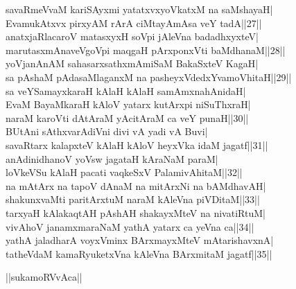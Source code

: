 \documentclass{article}
\begin{document}
savaRmeVvaM kariSAyxmi yatatxvxyoVkatxM na saMshayaH|\\
EvamukAtxvx pirxyAM rArA ciMtayAmAsa veY tadA||27||\\
anatxjaRlacaroV matasxyxH soVpi jAleVna badadhxyxteV|\\
marutasxmAnaveVgoVpi maqgaH pArxponxVti baMdhanaM||28||\\
yoVjanAnAM sahasarxsathxmAmiSaM BakaSxteV KagaH|\\
sa pAshaM pAdasaMlaganxM na pasheyxVdedxYvamoVhitaH||29||\\
sa veYSamayxkaraH kAlaH kAlaH samAmxnahAnidaH|\\
EvaM BayaMkaraH kAloV yatarx kutArxpi niSuThxraH|\\
naraM karoVti dAtAraM yAcitAraM ca veY punaH||30||\\
BUtAni sAthxvarAdiVni divi vA yadi vA Buvi|\\
savaRtarx kalapxteV kAlaH kAloV heyxVka idaM jagatf||31||\\
anAdinidhanoV yoVsw jagataH kAraNaM paraM|\\
loVkeVSu kAlaH pacati vaqkeSxV PalamivAhitaM||32||\\
na mAtArx na tapoV dAnaM na mitArxNi na bAMdhavAH|\\
shakunxvaMti paritArxtuM naraM kAleVna piVDitaM||33||\\
tarxyaH kAlakaqtAH pAshAH shakayxMteV na nivatiRtuM|\\
vivAhoV janamxmaraNaM yathA yatarx ca yeVna ca||34||\\
yathA jaladharA voyxVminx BArxmayxMteV mAtarishavxnA|\\
tatheVdaM kamaRyuketxVna kAleVna BArxmitaM jagatf||35||\\

\begin{center}
||sukamoRVvAca||
\end{center}
\end{document}
